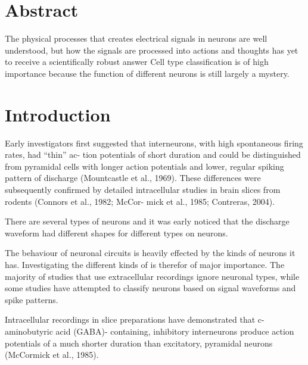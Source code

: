 \documentclass[altfont, fleqn]{uiophd}
\begin{document}
\chapter*{Abstract}
\noindent
The physical processes that creates electrical signals in neurons are well understood, 
but how the signals are processed into actions and thoughts has yet to 
receive a scientifically robust answer
Cell type classification is of high importance because the function of different 
neurons is still largely a mystery. 
\setcounter{tocdepth}{1}
\startcontents
\tableofcontents
\chapter{Introduction}


Early investigators first suggested that
interneurons, with high spontaneous firing rates, had “thin” ac-
tion potentials of short duration and could be distinguished from
pyramidal cells with longer action potentials and lower, regular
spiking pattern of discharge (Mountcastle et al., 1969). These
differences were subsequently confirmed by detailed intracellular
studies in brain slices from rodents (Connors et al., 1982; McCor-
mick et al., 1985; Contreras, 2004).

There are several types of neurons 
and it was early noticed that the discharge waveform
had different shapes
for different types on neurons.

The behaviour of neuronal circuits is heavily effected by the kinds of neurons
it has. 
Investigating the different kinds of is therefor of major importance. 
The majority of studies that use  extracellular recordings ignore 
neuronal types, while some studies have attempted to classify
neurons based on signal waveforms and spike patterns. 

Intracellular recordings in slice
preparations have demonstrated that c-aminobutyric acid (GABA)-
containing, inhibitory interneurons produce action potentials of a
much shorter duration than excitatory, pyramidal neurons (McCormick
et al., 1985).
\end{document}

